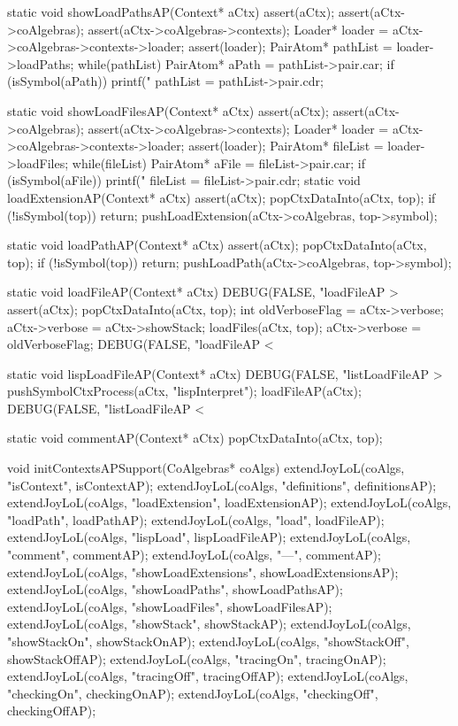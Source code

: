 static void showLoadPathsAP(Context* aCtx) {
  assert(aCtx);
  assert(aCtx->coAlgebras);
  assert(aCtx->coAlgebras->contexts);
  Loader* loader = aCtx->coAlgebras->contexts->loader;
  assert(loader);
  PairAtom* pathList = loader->loadPaths;
  while(pathList) {
    PairAtom* aPath = pathList->pair.car;
    if (isSymbol(aPath)) printf("%
    pathList = pathList->pair.cdr;
  }
}

static void showLoadFilesAP(Context* aCtx) {
  assert(aCtx);
  assert(aCtx->coAlgebras);
  assert(aCtx->coAlgebras->contexts);
  Loader* loader = aCtx->coAlgebras->contexts->loader;
  assert(loader);
  PairAtom* fileList = loader->loadFiles;
  while(fileList) {
    PairAtom* aFile = fileList->pair.car;
    if (isSymbol(aFile)) printf("%
    fileList = fileList->pair.cdr;
  }
}
static void loadExtensionAP(Context* aCtx) {
  assert(aCtx);
  popCtxDataInto(aCtx, top);
  if (!isSymbol(top)) return;
  pushLoadExtension(aCtx->coAlgebras, top->symbol);
}

static void loadPathAP(Context* aCtx) {
  assert(aCtx);
  popCtxDataInto(aCtx, top);
  if (!isSymbol(top)) return;
  pushLoadPath(aCtx->coAlgebras, top->symbol);
}

static void loadFileAP(Context* aCtx) {
  DEBUG(FALSE, "loadFileAP > %
  assert(aCtx);
  popCtxDataInto(aCtx, top);
  int oldVerboseFlag = aCtx->verbose;
  aCtx->verbose = aCtx->showStack;
  loadFiles(aCtx, top);
  aCtx->verbose = oldVerboseFlag;
  DEBUG(FALSE, "loadFileAP < %
}

static void lispLoadFileAP(Context* aCtx) {
  DEBUG(FALSE, "listLoadFileAP > %
  pushSymbolCtxProcess(aCtx, "lispInterpret");
  loadFileAP(aCtx);
  DEBUG(FALSE, "listLoadFileAP < %
}

static void commentAP(Context* aCtx) {
  popCtxDataInto(aCtx, top);
}

void initContextsAPSupport(CoAlgebras* coAlgs) {
  extendJoyLoL(coAlgs, "isContext",           isContextAP);
  extendJoyLoL(coAlgs, "definitions",         definitionsAP);
  extendJoyLoL(coAlgs, "loadExtension",       loadExtensionAP);
  extendJoyLoL(coAlgs, "loadPath",            loadPathAP);
  extendJoyLoL(coAlgs, "load",                loadFileAP);
  extendJoyLoL(coAlgs, "lispLoad",            lispLoadFileAP);
  extendJoyLoL(coAlgs, "comment",             commentAP);
  extendJoyLoL(coAlgs, "---",                 commentAP);
  extendJoyLoL(coAlgs, "showLoadExtensions",  showLoadExtensionsAP);
  extendJoyLoL(coAlgs, "showLoadPaths",       showLoadPathsAP);
  extendJoyLoL(coAlgs, "showLoadFiles",       showLoadFilesAP);
  extendJoyLoL(coAlgs, "showStack",           showStackAP);
  extendJoyLoL(coAlgs, "showStackOn",         showStackOnAP);
  extendJoyLoL(coAlgs, "showStackOff",        showStackOffAP);
  extendJoyLoL(coAlgs, "tracingOn",           tracingOnAP);
  extendJoyLoL(coAlgs, "tracingOff",          tracingOffAP);
  extendJoyLoL(coAlgs, "checkingOn",          checkingOnAP);
  extendJoyLoL(coAlgs, "checkingOff",         checkingOffAP);
}
\stoptyping

